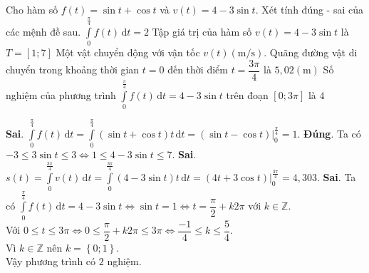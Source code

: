 \begin{ex}%
	Cho hàm số $f(t)=\sin t +\cos t$ và $v(t)=4-3 \sin t$. Xét tính đúng - sai của các mệnh đề sau.
	\choiceTF
	{$\displaystyle\int\limits_0^{\frac{\pi}{4}} f(t)\mathrm{\,d}t=2$}
	{\True Tập giá trị của hàm số $v(t)=4-3\sin t$ là $T=\left[ 1;7\right]$}
	{Một vật chuyển động với vận tốc $v(t) (\mathrm{m/s})$. Quãng đường vật di chuyển trong khoảng thời gian $t=0$ đến thời điểm $t=\dfrac{3\pi}{4}$ là $5{,}02 (\mathrm{m})$}
	{Số nghiệm của phương trình $\displaystyle\int\limits_0^{\frac{\pi}{4}} f(t)\mathrm{\,d}t=4-3\sin t$ trên đoạn $\left[ 0;3 \pi \right] $ là $4$}
	\loigiai
	{
		\begin{itemchoice}
			\itemch \textbf{Sai}. $\displaystyle\int\limits_0^{\frac{\pi}{4}} f(t)\mathrm{\,d}t=\displaystyle\int\limits_0^{\frac{\pi}{4}} \left( \sin t+\cos t\right) t\mathrm{\,d}t=\left. \left( \sin t-\cos t \right) \right| _0^{\frac{\pi}{4}}=1$.
			\itemch \textbf{Đúng}. Ta có $-3 \le 3\sin t \le 3 \Leftrightarrow 1 \le 4-3\sin t \le 7$.
			\itemch \textbf{Sai}. $s(t)=\displaystyle\int\limits_0^{\frac{3\pi}{4}} v(t) \mathrm{\,d}t=\displaystyle\int\limits_0^{\frac{3\pi}{4}} \left( 4-3\sin t\right) t\mathrm{\,d}t=\left. \left( 4t+3 \cos t\right) \right|_0^{\frac{3\pi}{4}}=4{,}303$.
			\itemch \textbf{Sai}. Ta có $\displaystyle\int\limits_0^{\frac{\pi}{4}} f(t) \mathrm{\,d}t=4-3\sin t \Leftrightarrow \sin t=1 \Leftrightarrow t=\dfrac{\pi}{2}+k2\pi$ với $k\in \mathbb{Z}$.\\
			Với $0 \le t \le 3 \pi \Leftrightarrow 0 \le \dfrac{\pi}{2}+k2\pi \le 3 \pi \Leftrightarrow \dfrac{-1}{4} \le k \le \dfrac{5}{4}$.\\
			Vì $k \in \mathbb{Z}$ nên $k=\left\lbrace 0;1 \right\rbrace $.\\
			Vậy phương trình có $2$ nghiệm.
		\end{itemchoice}
	}
\end{ex}

